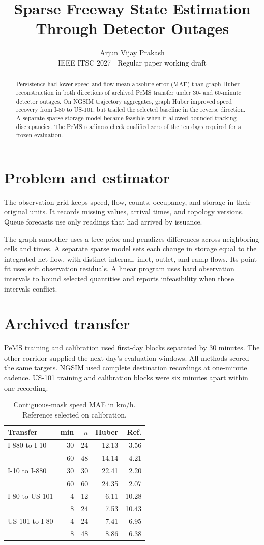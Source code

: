 \documentclass[conference]{IEEEtran}
\title{Sparse Freeway State Estimation Through Detector Outages}
\author{Arjun Vijay Prakash \\ \small IEEE ITSC 2027 | Regular paper working draft}
\begin{document}
\maketitle
\begin{abstract}
Persistence had lower speed and flow mean absolute error (MAE) than graph Huber reconstruction
in both directions of archived PeMS transfer under 30- and 60-minute detector outages.
On NGSIM trajectory aggregates, graph Huber improved speed recovery from I-80 to US-101,
but trailed the selected baseline in the reverse direction. A separate sparse storage model
became feasible when it allowed bounded tracking discrepancies. The PeMS readiness check
qualified zero of the ten days required for a frozen evaluation.
\end{abstract}

\section*{Problem and estimator}
The observation grid keeps speed, flow, counts, occupancy, and storage in their original
units. It records missing values, arrival times, and topology versions. Queue forecasts use
only readings that had arrived by issuance.

The graph smoother uses a tree prior and penalizes differences across neighboring cells
and times. A separate sparse model sets each change in storage equal to the integrated
net flow, with distinct internal, inlet, outlet, and ramp flows. Its point fit uses soft
observation residuals. A linear program uses hard observation intervals to bound selected
quantities and reports infeasibility when those intervals conflict.

\section*{Archived transfer}
PeMS training and calibration used first-day blocks separated by 30 minutes. The other
corridor supplied the next day's evaluation windows. All methods scored the same targets.
NGSIM used complete destination recordings at one-minute cadence. US-101 training and
calibration blocks were six minutes apart within one recording.

\begin{table}[h]
\centering\small
\caption{Contiguous-mask speed MAE in km/h. Reference selected on calibration.}
\begin{tabular}{lrrrr}
\hline
Transfer & min & $n$ & Huber & Ref. \\
\hline
I-880 to I-10 & 30 & 24 & 12.13 & 3.56 \\
 & 60 & 48 & 14.14 & 4.21 \\
I-10 to I-880 & 30 & 30 & 22.41 & 2.20 \\
 & 60 & 60 & 24.35 & 2.07 \\
I-80 to US-101 & 4 & 12 & 6.11 & 10.28 \\
 & 8 & 24 & 7.53 & 10.43 \\
US-101 to I-80 & 4 & 24 & 7.41 & 6.95 \\
 & 8 & 48 & 8.86 & 6.38 \\
\hline
\end{tabular}
\end{table}
\end{document}
